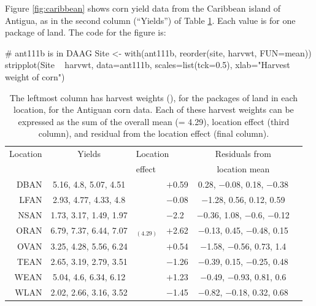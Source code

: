 Figure \ref{fig:caribbean} shows corn yield data from the Caribbean island of
Antigua, as in the second column (``Yields'') of Table \ref{tab:ant111b}.
Each value is for one package of land.
The code for the figure is:
\begin{Schunk}
\begin{Sinput}
# ant111b is in DAAG
Site <- with(ant111b, reorder(site, harvwt,
                              FUN=mean))
stripplot(Site ~ harvwt, data=ant111b,
          scales=list(tck=0.5),
          xlab="Harvest weight of corn")
\end{Sinput}
\end{Schunk}

\begin{table}
\begin{center}
{\small
\begin{tabular}{@{}rc||r@{\hspace{1mm}}lcc@{}}
\hline
\multicolumn{1}{c}{Location}  & \multicolumn{1}{c}{Yields}  &
\multicolumn{2}{l}{Location} & Residuals from\\
 & & \multicolumn{2}{l}{effect} & \multicolumn{1}{c}{location mean}\\
\hline
DBAN &  5.16, 4.8, 5.07, 4.51 &  \vline& $+$0.59 & 0.28, $-$0.08, 0.18, $-$0.38 \\
LFAN &  2.93, 4.77, 4.33, 4.8 &  \vline& $-$0.08 &  $-$1.28, 0.56, 0.12, 0.59 \\
NSAN & 1.73, 3.17, 1.49, 1.97 &  \vline& $-$2.2 & $-$0.36, 1.08, $-$0.6, $-$0.12 \\
ORAN & 6.79, 7.37, 6.44, 7.07 & $_{(4.29)} $ \vline& $+$2.62 & $-$0.13, 0.45, $-$0.48, 0.15 \\
OVAN & 3.25, 4.28, 5.56, 6.24 &  \vline& $+$0.54 &  $-$1.58, $-$0.56, 0.73, 1.4 \\
TEAN & 2.65, 3.19, 2.79, 3.51 &  \vline& $-$1.26 & $-$0.39, 0.15, $-$0.25, 0.48 \\
WEAN &  5.04, 4.6, 6.34, 6.12 &  \vline& $+$1.23 &  $-$0.49, $-$0.93, 0.81, 0.6 \\
WLAN & 2.02, 2.66, 3.16, 3.52 &  \vline& $-$1.45 & $-$0.82, $-$0.18, 0.32, 0.68 \\
\hline
\end{tabular}
}
\caption{The leftmost column has harvest weights (), for
  the packages of land in each location, for the Antiguan corn data.  Each of
  these harvest weights can be expressed as the sum of the overall
  mean (= 4.29), location effect (third column), and residual from the
  location effect (final column).
\label{tab:ant111b}}
\end{center}
\vspace*{-0pt}
\end{table}
\vspace*{3pt}

